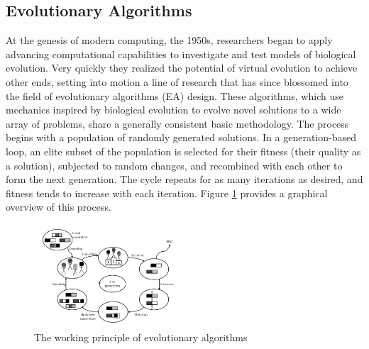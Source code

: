 \documentclass[a4paper]{article}
\begin{document}
\subsection{Evolutionary Algorithms}
At the genesis of modern computing, the 1950s, researchers began to apply advancing computational capabilities to investigate and test models of biological evolution. Very quickly they realized the potential of virtual evolution to achieve other ends, setting into motion a line of research that has since blossomed into the field of evolutionary algorithms (EA) design. These algorithms, which use mechanics inspired by biological evolution to evolve novel solutions to a wide array of problems, share a generally consistent basic methodology. The process begins with a population of randomly generated solutions. In a generation-based loop, an elite subset of the population is selected for their fitness (their quality as a solution), subjected to random changes, and recombined with each other to form the next generation. The cycle repeats for as many iterations as desired, and fitness tends to increase with each iteration. Figure \ref{fig:working_principle} provides a graphical overview of this process.
\begin{figure}
\centering
\includegraphics[width=0.5\textwidth]{working_principle_of_EA.jpg}
\caption{\label{fig:working_principle} The working principle of evolutionary algorithms \cite{Prothmann2009EvolutionaryOptimisation}} 
\end{figure}
\end{document}
